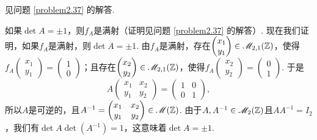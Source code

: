 \begin{solution}
  \begin{inparaenum}[(a)]
    \item 见问题 \ref{problem2.37} 的解答.

    \item 如果$\det A=\pm1$，则$f_A$是满射（证明见问题 \ref{problem2.37} 的解答）. 现在我们证明，如果$f_A$是满射，则$\det A=\pm1$. 由$f_A$是满射，存在$\begin{pmatrix}
          x_1 \\ y_1
        \end{pmatrix}\in\mathscr M_{2,1}(\mathbb Z)$，使得$f_A\begin{pmatrix}
          x_1 \\ y_1
        \end{pmatrix}=\begin{pmatrix}
          1 \\ 0
        \end{pmatrix}$；且存在$\begin{pmatrix}
          x_2 \\ y_2
        \end{pmatrix}\in\mathscr M_{2,1}(\mathbb Z)$，使得$f_A\begin{pmatrix}
          x_2 \\ y_2
        \end{pmatrix}=\begin{pmatrix}
          0 \\ 1
        \end{pmatrix}$. 于是
        \[
          A\begin{pmatrix}
            x_1 & x_2 \\
            y_1 & y_2
          \end{pmatrix} = \begin{pmatrix}
            1 & 0 \\
            0 & 1
          \end{pmatrix},
        \]
        所以$A$是可逆的，且$A^{-1}=\begin{pmatrix}
          x_1 & x_2 \\
          y_1 & y_2
        \end{pmatrix}\in\mathscr M(\mathbb Z)$. 由于$A,A^{-1}\in\mathscr M_2(\mathbb Z)$且$AA^{-1}=I_2$，我们有$\det A\det(A^{-1})=1$，这意味着$\det A=\pm1$.
  \end{inparaenum}
\end{solution}

